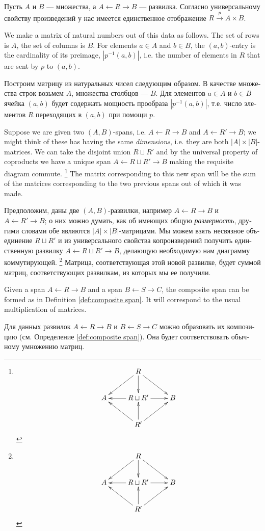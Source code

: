 \documentclass[a4paper]{book}
\def\to{\rightarrow}
\def\from{\leftarrow}
\def\m1{{-1}}
\newcommand{\To}[1]{\xrightarrow{#1}}
\theoremstyle{myth}
\begin{document}
\begin{russian}
Пусть $A$ и $B$ — множества, а $A\from R\to B$ — развилка. Согласно универсальному свойству произведений у нас имеется единственное отображение $R\To{p}A\times B$. 

We make a matrix of natural numbers out of this data as follows. The set of rows is $A$, the set of columns is $B$. For elements $a\in A$ and $b\in B$, the $(a,b)$-entry is the cardinality of its preimage, $|p^\m1(a,b)|$, i.e. the number of elements in $R$ that are sent by $p$ to $(a,b)$. 

Построим матрицу из натуральных чисел следующим образом. В качестве множества строк возьмем $A$, множества столбцов — $B$. Для элементов $a\in A$ и $b\in B$ ячейка $(a,b)$ будет содержать мощность прообраза $|p^\m1(a,b)|$, т.е. число элементов $R$ переходящих в $(a,b)$ при помощи $p$. 

Suppose we are given two $(A,B)$-spans, i.e. $A\from R\to B$ and $A\from R'\to B$; we might think of these has having the same {\em dimensions}, i.e. they are both $|A|\times|B|$-matrices. We can take the disjoint union $R\sqcup R'$ and by the universal property of coproducts we have a unique span $A\from R\sqcup R'\to B$ making the requisite diagram commute.%
\footnote{
$$\xymatrix{
&R\ar[dl]\ar[dr]\ar[d]\\
A&R\sqcup R'\ar[l]\ar[r]&B\\
&R'\ar[ur]\ar[ul]\ar[u]}
$$
}
The matrix corresponding to this new span will be the sum of the matrices corresponding to the two previous spans out of which it was made.

Предположим, даны две $(A,B)$-развилки, например $A\from R\to B$ и $A\from R'\to B$; о них можно думать, как об имеющих общую {\em размерность}, другими словами обе являются $|A|\times|B|$-матрицами. Мы можем взять несвязное объединение $R\sqcup R'$ и из универсального свойства копроизведений получить единственную развилку $A\from R\sqcup R'\to B$, делающую необходимую нам диаграмму коммутирующей.%
\footnote{
$$\xymatrix{
&R\ar[dl]\ar[dr]\ar[d]\\
A&R\sqcup R'\ar[l]\ar[r]&B\\
&R'\ar[ur]\ar[ul]\ar[u]}
$$
}
Матрица, соответствующая этой новой развилке, будет суммой матриц, соответствующих развилкам, из которых мы ее получили.

Given a span $A\from R\to B$ and a span $B\from S\to C$, the composite span can be formed as in Definition \ref{def:composite span}. It will correspond to the usual multiplication of matrices.

Для данных развилок $A\from R\to B$ и $B\from S\to C$ можно образовать их композицию (см. Определение \ref{def:composite span}). Она будет соответствовать обычному умножению матриц.


\end{russian}
\end{document}
